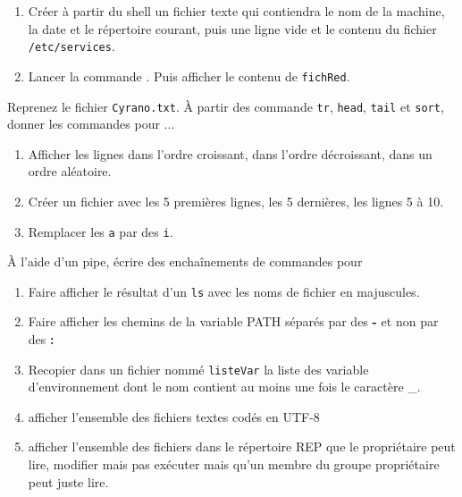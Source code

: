\documentclass[a4paper,11pt]{exam}
\begin{document}
{
\begin{enumerate}
 \item Créer à partir du shell un fichier texte qui contiendra le nom de la machine, la date et le répertoire courant, puis une ligne vide et le contenu du fichier \texttt{/etc/services}.
 \item Lancer la commande   . Puis afficher le contenu de \texttt{fichRed}.
\end{enumerate}

 	

}

{
	Reprenez le fichier \texttt{Cyrano.txt}. À partir des commande \texttt{tr}, \texttt{head}, \texttt{tail} et \texttt{sort}, donner les commandes pour ...
	\begin{enumerate}
	\item Afficher les lignes dans l'ordre croissant, dans l'ordre décroissant, dans un ordre aléatoire.
	\item Créer un fichier avec les 5 premières lignes, les 5 dernières, les lignes 5 à 10.
	\item Remplacer les \texttt{a} par des \texttt{i}.
	\end{enumerate}
}

{
	À l'aide d'un pipe, écrire des enchaînements de commandes pour 
	\begin{enumerate}	
	\item Faire afficher le résultat d'un \texttt{ls} avec les noms de fichier en majuscules.
	\item Faire afficher les chemins de la variable PATH séparés par des \textbf{-} et non par des \textbf{:}
	\item Recopier dans un fichier nommé \texttt{listeVar} la liste des variable d’environnement dont le nom contient au moins une fois le caractère \_.
	\item afficher l’ensemble des fichiers textes codés en UTF-8
	\item  afficher l’ensemble des fichiers dans le répertoire REP que le propriétaire peut lire, modifier mais pas exécuter mais qu’un membre du groupe propriétaire peut juste lire.
	\end{enumerate}
}
 
\end{document}
